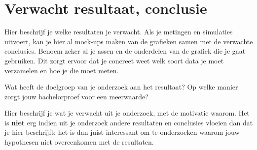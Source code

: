 





\section{Verwacht resultaat, conclusie}%
\label{sec:verwachte_resultaten}

Hier beschrijf je welke resultaten je verwacht. Als je metingen en simulaties uitvoert, kan je hier al mock-ups maken van de grafieken samen met de verwachte conclusies. Benoem zeker al je assen en de onderdelen van de grafiek die je gaat gebruiken. Dit zorgt ervoor dat je concreet weet welk soort data je moet verzamelen en hoe je die moet meten.

Wat heeft de doelgroep van je onderzoek aan het resultaat? Op welke manier zorgt jouw bachelorproef voor een meerwaarde?

Hier beschrijf je wat je verwacht uit je onderzoek, met de motivatie waarom. Het is \textbf{niet} erg indien uit je onderzoek andere resultaten en conclusies vloeien dan dat je hier beschrijft: het is dan juist interessant om te onderzoeken waarom jouw hypothesen niet overeenkomen met de resultaten.

